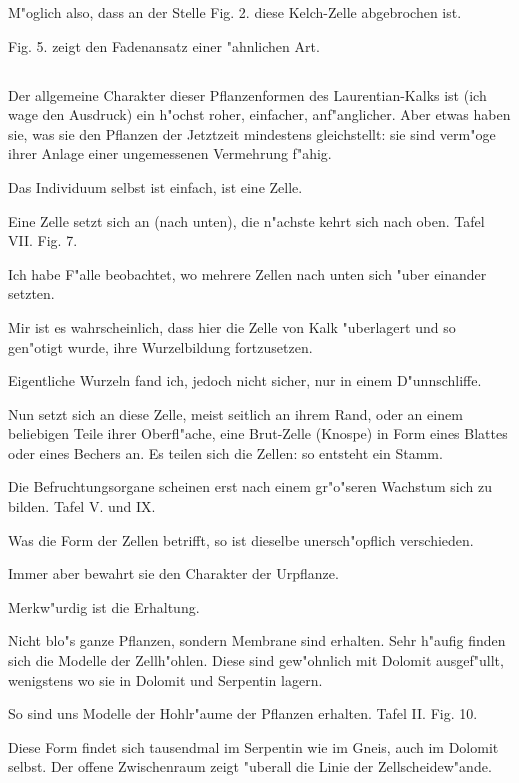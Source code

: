 \documentclass[a4paper, 11pt, oneside, german]{article}
\begin{document}
M"oglich also, dass an der Stelle Fig. 2. diese Kelch-Zelle abgebrochen ist.

Fig. 5. zeigt den Fadenansatz einer "ahnlichen Art.
\clearpage
\subsection{}
\paragraph{}
Der allgemeine Charakter dieser Pflanzenformen des Laurentian-Kalks ist (ich wage den Ausdruck) ein h"ochst roher, einfacher, anf"anglicher. Aber etwas haben sie, was sie den Pflanzen der Jetztzeit mindestens gleichstellt: sie sind verm"oge ihrer Anlage einer ungemessenen Vermehrung f"ahig.

Das Individuum selbst ist einfach, ist eine Zelle.

Eine Zelle setzt sich an (nach unten), die n"achste kehrt sich nach oben. Tafel VII. Fig. 7.

Ich habe F"alle beobachtet, wo mehrere Zellen nach unten sich "uber einander setzten.

Mir ist es wahrscheinlich, dass hier die Zelle von Kalk "uberlagert und so gen"otigt wurde, ihre Wurzelbildung fortzusetzen.

Eigentliche Wurzeln fand ich, jedoch nicht sicher, nur in einem D"unnschliffe.

Nun setzt sich an diese Zelle, meist seitlich an ihrem Rand, oder an einem beliebigen Teile ihrer Oberfl"ache, eine Brut-Zelle (Knospe) in Form eines Blattes oder eines Bechers an. Es teilen sich die Zellen: so entsteht ein Stamm.

Die Befruchtungsorgane scheinen erst nach einem gr"o"seren Wachstum sich zu bilden. Tafel V. und IX.

Was die Form der Zellen betrifft, so ist dieselbe unersch"opflich verschieden.

Immer aber bewahrt sie den Charakter der Urpflanze.

Merkw"urdig ist die Erhaltung.

Nicht blo"s ganze Pflanzen, sondern Membrane sind erhalten. Sehr h"aufig finden sich die Modelle der Zellh"ohlen. Diese sind gew"ohnlich mit Dolomit ausgef"ullt, wenigstens wo sie in Dolomit und Serpentin lagern.

So sind uns Modelle der Hohlr"aume der Pflanzen erhalten. Tafel II. Fig. 10.

Diese Form findet sich tausendmal im Serpentin wie im Gneis, auch im Dolomit selbst. Der offene Zwischenraum zeigt "uberall die Linie der Zellscheidew"ande.
\end{document}
